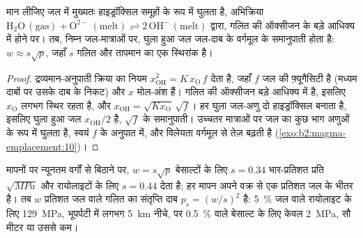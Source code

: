 \begin{proposition}[जल के लिए वर्गमूल नियम]\label{prop:b2:magma-emplacement:sqrt}
मान लीजिए जल  में मुख्यतः हाइड्रॉक्सिल समूहों के रूप में घुलता है,
अभिक्रिया $\mathrm{H_2O\,(gas)} + \mathrm{O^{2-}\,(melt)} \rightleftharpoons
2\,\mathrm{OH^-\,(melt)}$ द्वारा, गलित की ऑक्सीजन के बड़े आधिक्य में होने पर। तब,
निम्न जल-मात्राओं पर, घुला हुआ जल जल-दाब के वर्गमूल के
समानुपाती होता है: $w \approx s\sqrt{p}$, जहाँ $s$ गलित और
तापमान का एक स्थिरांक है।
\end{proposition}

\begin{proof}
द्रव्यमान-अनुपाती क्रिया का नियम $x_{\mathrm{OH}}^2 = K\,x_{\mathrm{O}}\,f$ देता है, जहाँ $f$
जल की फ़्यूगैसिटी है (मध्यम दाबों पर उसके दाब के निकट) और $x$
मोल-अंश हैं। गलित की ऑक्सीजन बड़े आधिक्य में है, इसलिए
$x_{\mathrm{O}}$ लगभग स्थिर रहता है, और $x_{\mathrm{OH}} = \sqrt{Kx_{\mathrm{O}}}\,
\sqrt f$। हर घुला जल-अणु दो हाइड्रॉक्सिल बनाता है, इसलिए घुला हुआ
जल $x_{\mathrm{OH}}/2$ है, $\sqrt f$ के समानुपाती। उच्चतर मात्राओं पर जल का कुछ भाग
अणुओं के रूप में घुलता है, स्वयं $f$ के अनुपात में, और
विलेयता वर्गमूल से तेज़ बढ़ती है (\cref{exo:b2:magma-emplacement:10})।
\end{proof}

मापनों पर न्यूनतम वर्गों से बिठाने पर, $w = s\sqrt p$ बेसाल्टों के लिए
$s = 0.34$ भार-प्रतिशत प्रति $\sqrt{\unit{MPa}}$ और
रायोलाइटों के लिए $s = 0.44$ देता है; हर मापन अपने वक्र से एक प्रतिशत
जल के भीतर है। तब $w$ प्रतिशत जल वाले गलित का संतृप्ति दाब
$p_s = (w/s)^2$ है: \qty{5}{\percent} जल वाले रायोलाइट के लिए \qty{129}{MPa},
भूपर्पटी में लगभग \qty{5}{km} नीचे, पर \qty{0.5}{\percent} वाले बेसाल्ट के लिए केवल
\qty{2}{MPa}, सौ मीटर या उससे कम।

